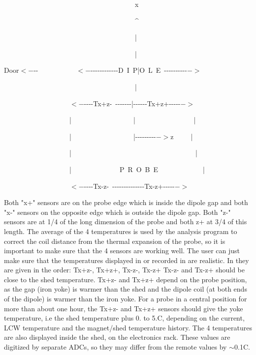 {\begin{lyxcode}
~~~~~~~~~~~~~~~~~~~~~~~~~~~~~~~~~~~~~~x~

~~~~~~~~~~~~~~~~~~~~~~~~~~~~~~~~~~~~~~\^{}~

~~~~~~~~~~~~~~~~~~~~~~~~~~~~~~~~~~~~~~|~

~~~~~~~~~~~~~~~~~~~~~~~~~~~~~~~~~~~~~~|~

Door$< -${}-{}-~~~~~~~~~~~$< 
-${}-{}-{}-{}-{}-{}-{}-{}-{}-{}-{}-{}-D~I~P|O~L~E~-{}-{}-{}-{}-{}-{}-{}-{}-{}-{}$-
>$~

~~~~~~~~~~~~~~~~~~~~~~~~~~~~~~~~~~~~~~|~

~~~~~~~~~~~~~~~~~~~$< 
-${}-{}-{}-{}-Tx+z-~-{}-{}-{}-{}-{}-{}-|-{}-{}-{}-{}-{}-Tx+z+-{}-{}-{}-{}-{}$->$~

~~~~~~~~~~~~~~~~~~~|~~~~~~~~~~~~~~~~~~|~~~~~~~~~~~~~~~~~|~

~~~~~~~~~~~~~~~~~~~|~~~~~~~~~~~~~~~~~~|-{}-{}-{}-{}-{}-{}-{}-{}-{}$->$z~~~~~|~

~~~~~~~~~~~~~~~~~~~|~~~~~~~~~~~~~~~~~~~~~~~~~~~~~~~~~~~~|~

~~~~~~~~~~~~~~~~~~~|~~~~~~~~~~~~~~P~R~O~B~E~~~~~~~~~~~~~|~

~~~~~~~~~~~~~~~~~~~$< 
-${}-{}-{}-{}-Tx-z-~-{}-{}-{}-{}-{}-{}-{}-{}-{}-{}-{}-{}-{}-Tx-z+-{}-{}-{}-{}-{}$-
>$
\end{lyxcode}

Both "x+" sensors are on the probe edge which is inside the
dipole gap and both "x-" sensors on the opposite edge which
is outside the dipole gap. Both "z-" sensors are at 1/4 of
the long dimension of the probe and both z+ at 3/4 of this length. The average
of the 4 temperatures is used by the analysis program to correct the coil distance
from the thermal expansion of the probe, so it is important to make sure that
the 4 sensors are working well. The user can just make sure that the temperatures
displayed in  or recorded in 
are realistic. In  they are given in the
order: Tx+z-, Tx+z+, Tx-z-, Tx-z+ Tx-z- and Tx-z+ should be close to the shed
temperature. Tx+z- and Tx+z+ depend on the probe position, as the gap (iron
yoke) is warmer than the shed and the dipole coil (at both ends of the dipole)
is warmer than the iron yoke. For a probe in a central position for more than
about one hour, the Tx+z- and Tx+z+ sensors should give the yoke temperature,
i.e the shed temperature plus 0. to 5.C, depending on the current, LCW temperature
and the magnet/shed temperature history. The 4 temperatures are also displayed
inside the shed, on the electronics rack. These values are digitized by separate
ADCs, so they may differ from the remote values by \( \sim  \)0.1C. 

}

